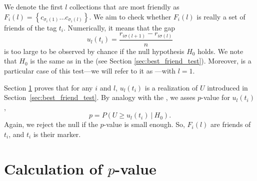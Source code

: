 \documentclass{llncs}
\begin{document}
We denote the first $l$ collections that are most friendly as $F_{i}(l) = \left\{ c_{\sigma_i(1)} \dots c_{\sigma_i(l)} \right\}$.
We aim to check whether $F_{i}(l)$ is really a set of friends of the tag $t_i$. Numerically, it means that the gap 
\begin{equation}
\label{def:u_l}
u_{l}(t_i) = \frac{r_{i\sigma(l+1)} - r_{i\sigma(l)}}{n}
\end{equation}
is too large to be observed by chance if the null hypothesis $H_0$ holds. We note that $H_0$ is the same as in the  (see Section \ref{sec:best_friend_test}).
Moreover,  is a particular case of
this test---we will refer to it as ---with $l = 1$.


Section \ref{sec:theory} proves that for any $i$ and $l$, $u_l(t_i)$ is a realization of $U$ introduced  in Section~\ref{sec:best_friend_test}.
By analogy with the , we asses $p$-value for $u_{l}(t_i)$,
\[
p = P\left(U \ge u_l(t_i)~|~H_0\right). 
\]
Again, we reject the null if the $p$-value is small enough. So, $F_{i}(l)$ are friends of $t_i$, and $t_i$ is their marker.


\section{Calculation of $p$-value}
\label{sec:theory}

 
\end{document}
